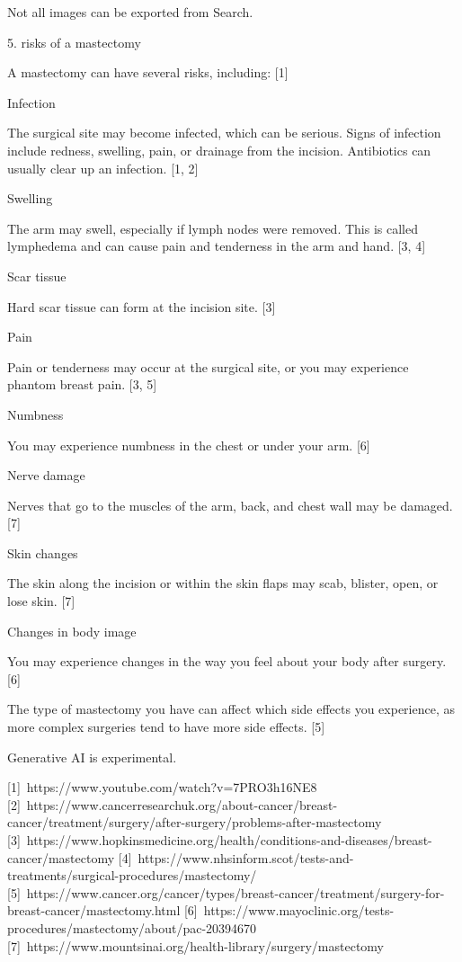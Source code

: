 Not all images can be exported from Search.

5. risks of a mastectomy

A mastectomy can have several risks, including: [1]  

Infection 

The surgical site may become infected, which can be serious. Signs of infection include redness, swelling, pain, or drainage from the incision. Antibiotics can usually clear up an infection. [1, 2]  

Swelling 

The arm may swell, especially if lymph nodes were removed. This is called lymphedema and can cause pain and tenderness in the arm and hand. [3, 4]  

Scar tissue 

Hard scar tissue can form at the incision site. [3]  

Pain 

Pain or tenderness may occur at the surgical site, or you may experience phantom breast pain. [3, 5]  

Numbness 

You may experience numbness in the chest or under your arm. [6]  

Nerve damage 

Nerves that go to the muscles of the arm, back, and chest wall may be damaged. [7]  

Skin changes 

The skin along the incision or within the skin flaps may scab, blister, open, or lose skin. [7]  

Changes in body image 

You may experience changes in the way you feel about your body after surgery. [6]  


The type of mastectomy you have can affect which side effects you experience, as more complex surgeries tend to have more side effects. [5]  

Generative AI is experimental.

[1] https://www.youtube.com/watch?v=7PRO3h16NE8
[2] https://www.cancerresearchuk.org/about-cancer/breast-cancer/treatment/surgery/after-surgery/problems-after-mastectomy
[3] https://www.hopkinsmedicine.org/health/conditions-and-diseases/breast-cancer/mastectomy
[4] https://www.nhsinform.scot/tests-and-treatments/surgical-procedures/mastectomy/
[5] https://www.cancer.org/cancer/types/breast-cancer/treatment/surgery-for-breast-cancer/mastectomy.html
[6] https://www.mayoclinic.org/tests-procedures/mastectomy/about/pac-20394670
[7] https://www.mountsinai.org/health-library/surgery/mastectomy

